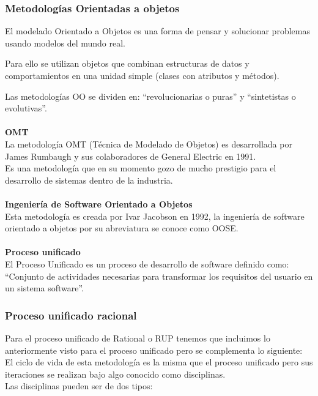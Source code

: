 \documentclass[12pt,twoside]{article}
\begin{document}
\subsubsection{Metodologías Orientadas a objetos}
El modelado Orientado a Objetos es una forma de pensar y solucionar problemas usando 
modelos del mundo real.

Para ello se utilizan objetos que combinan estructuras de datos y comportamientos en 
una unidad simple (clases con atributos y métodos).

Las metodologías OO se dividen en: “revolucionarias o puras” y “sintetistas o 
evolutivas”.\\ \\
\textbf{OMT}\\
La metodología OMT (Técnica de Modelado de Objetos) es desarrollada por James 
Rumbaugh y sus colaboradores de General Electric en 1991.\\
Es una metodología que en su momento gozo de mucho prestigio para el desarrollo de 
sistemas dentro de la industria.\\ \\

\textbf{Ingeniería de Software Orientado a Objetos}\\
Esta metodología es creada por Ivar Jacobson en 1992, la ingeniería de software orientado a objetos por su
abreviatura se conoce como OOSE.\\ \\

\textbf{Proceso unificado}\\
El Proceso Unificado es un proceso de desarrollo de software definido como:
“Conjunto de actividades necesarias para transformar los requisitos del usuario en 
un sistema software”.\\
\subsubsection{Proceso unificado racional}
Para el proceso unificado de Rational o RUP tenemos que incluimos lo anteriormente 
visto para el proceso unificado pero se complementa lo siguiente:\\
El ciclo de vida de esta metodología es la misma que el proceso unificado pero sus 
iteraciones se realizan bajo algo conocido como disciplinas.\\
Las disciplinas pueden ser de dos tipos:
\end{document}
